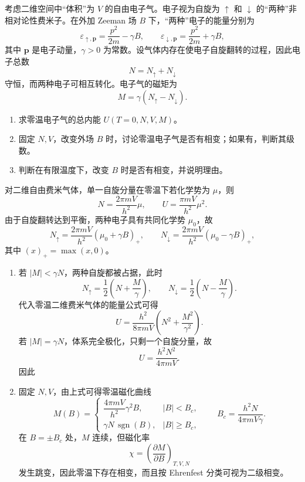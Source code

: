 \begin{question}
考虑二维空间中“体积”为 $V$ 的自由电子气。电子视为自旋为 $\uparrow$ 和 $\downarrow$ 的“两种”非相对论性费米子。在外加 Zeeman 场 $B$ 下，“两种”电子的能量分别为
\[
\varepsilon_{\uparrow,\mathbf p}=\frac{p^2}{2m}-\gamma B,
\qquad
\varepsilon_{\downarrow,\mathbf p}=\frac{p^2}{2m}+\gamma B,
\]
其中 $\mathbf p$ 是电子动量，$\gamma>0$ 为常数。设气体内存在使电子自旋翻转的过程，因此电子总数
\[
N=N_\uparrow+N_\downarrow
\]
守恒，而两种电子可相互转化。电子气的磁矩为
\[
M=\gamma(N_\uparrow-N_\downarrow).
\]

\begin{enumerate}[label=(\arabic*),leftmargin=2.5em]
  \item 求零温电子气的总内能 $U(T=0,N,V,M)$。
  \item 固定 $N,V$，改变外场 $B$ 时，讨论零温电子气是否有相变；如果有，判断其级数。
  \item 判断在有限温度下，改变 $B$ 时是否有相变，并说明理由。
\end{enumerate}

\begin{solution}
对二维自由费米气体，单一自旋分量在零温下若化学势为 $\mu$，则
\[
N=\frac{2\pi mV}{h^2}\mu,
\qquad
U=\frac{\pi mV}{h^2}\mu^2.
\]
由于自旋翻转达到平衡，两种电子具有共同化学势 $\mu_0$，故
\[
N_\uparrow=\frac{2\pi mV}{h^2}(\mu_0+\gamma B)_+,
\qquad
N_\downarrow=\frac{2\pi mV}{h^2}(\mu_0-\gamma B)_+,
\]
其中 $(x)_+=\max(x,0)$。

\begin{enumerate}[label=(\arabic*),leftmargin=2.5em]
  \item 若 $|M|<\gamma N$，两种自旋都被占据，此时
  \[
  N_\uparrow=\frac12\left(N+\frac{M}{\gamma}\right),
  \qquad
  N_\downarrow=\frac12\left(N-\frac{M}{\gamma}\right).
  \]
  代入零温二维费米气体的能量公式可得
  \[
  U=\frac{h^2}{8\pi mV}\left(N^2+\frac{M^2}{\gamma^2}\right).
  \]
  若 $|M|=\gamma N$，体系完全极化，只剩一个自旋分量，故
  \[
  U=\frac{h^2N^2}{4\pi mV}.
  \]
  因此

  \item 固定 $N,V$，由上式可得零温磁化曲线
  \[
  M(B)=
  \begin{cases}
  \dfrac{4\pi mV}{h^2}\gamma^2 B, & |B|<B_c,\\[1.1ex]
  \gamma N\,\operatorname{sgn}(B), & |B|\ge B_c,
  \end{cases}
  \qquad
  B_c=\frac{h^2N}{4\pi mV\gamma}.
  \]
  在 $B=\pm B_c$ 处，$M$ 连续，但磁化率
  \[
  \chi=\left(\frac{\partial M}{\partial B}\right)_{T,V,N}
  \]
  发生跳变，因此零温下存在相变，而且按 Ehrenfest 分类可视为二级相变。


\end{enumerate}
\end{solution}
\end{question}
